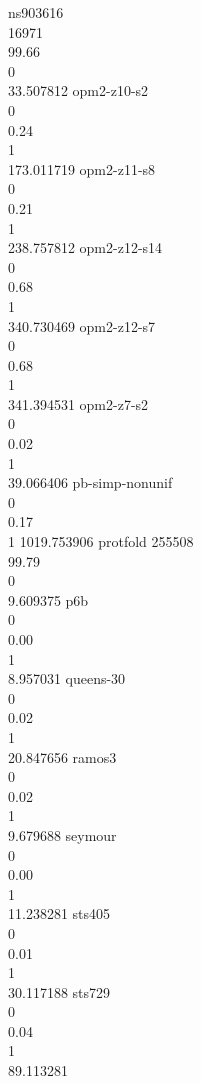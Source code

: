 ns903616 \\ 16971 \\ 99.66 \\ 0 \\ 33.507812
opm2-z10-s2 \\ 0 \\ 0.24 \\ 1 \\ 173.011719
opm2-z11-s8 \\ 0 \\ 0.21 \\ 1 \\ 238.757812
opm2-z12-s14 \\ 0 \\ 0.68 \\ 1 \\ 340.730469
opm2-z12-s7 \\ 0 \\ 0.68 \\ 1 \\ 341.394531
opm2-z7-s2 \\ 0 \\ 0.02 \\ 1 \\ 39.066406
pb-simp-nonunif \\ 0 \\ 0.17 \\ 1 1019.753906
protfold 255508 \\ 99.79 \\ 0 \\ 9.609375
p6b \\ 0 \\ 0.00 \\ 1 \\ 8.957031
queens-30 \\ 0 \\ 0.02 \\ 1 \\ 20.847656
ramos3 \\ 0 \\ 0.02 \\ 1 \\ 9.679688
seymour \\ 0 \\ 0.00 \\ 1 \\ 11.238281
sts405 \\ 0 \\ 0.01 \\ 1 \\ 30.117188
sts729 \\ 0 \\ 0.04 \\ 1 \\ 89.113281
